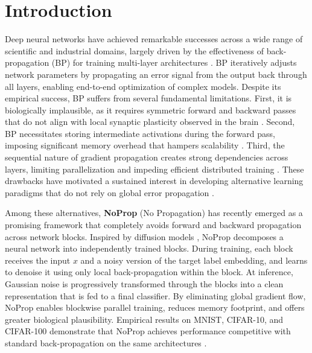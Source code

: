 \documentclass[preprint,12pt]{elsarticle}
\begin{document}

\section{Introduction}

Deep neural networks have achieved remarkable successes across a wide range of scientific and industrial domains, largely driven by the effectiveness of back-propagation (BP) for training multi-layer architectures \cite{rumelhart1986learning}. BP iteratively adjusts network parameters by propagating an error signal from the output back through all layers, enabling end-to-end optimization of complex models. Despite its empirical success, BP suffers from several fundamental limitations. First, it is biologically implausible, as it requires symmetric forward and backward passes that do not align with local synaptic plasticity observed in the brain \cite{grossberg1987competitive,lillicrap2016random}. Second, BP necessitates storing intermediate activations during the forward pass, imposing significant memory overhead that hampers scalability \cite{rumelhart1986learning}. Third, the sequential nature of gradient propagation creates strong dependencies across layers, limiting parallelization and impeding efficient distributed training \cite{carreira2014distributed}. These drawbacks have motivated a sustained interest in developing alternative learning paradigms that do not rely on global error propagation \cite{hinton2006fast,lee2015difference,nokland2016direct,jaderberg2017decoupled,hinton2022forward}.

Among these alternatives, \textbf{NoProp} (No Propagation) \cite{li2025noprop} has recently emerged as a promising framework that completely avoids forward and backward propagation across network blocks. Inspired by diffusion models \cite{sohl2015deep,ho2020denoising,song2021maximum}, NoProp decomposes a neural network into independently trained blocks. During training, each block receives the input $x$ and a noisy version of the target label embedding, and learns to denoise it using only local back-propagation within the block. At inference, Gaussian noise is progressively transformed through the blocks into a clean representation that is fed to a final classifier. By eliminating global gradient flow, NoProp enables blockwise parallel training, reduces memory footprint, and offers greater biological plausibility. Empirical results on MNIST, CIFAR-10, and CIFAR-100 demonstrate that NoProp achieves performance competitive with standard back-propagation on the same architectures \cite{li2025noprop}.
\end{document}
